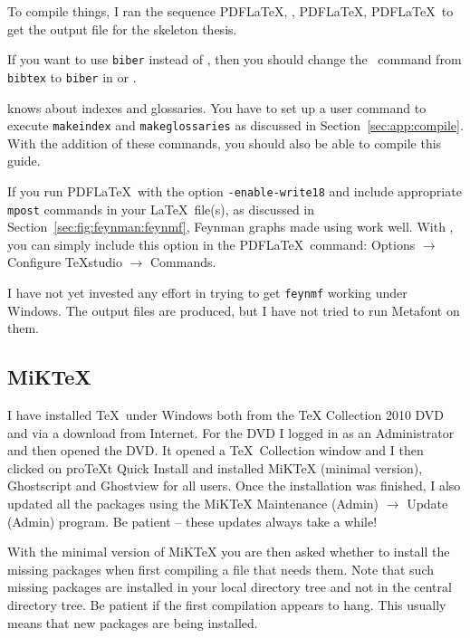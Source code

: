 To compile things, I ran the sequence PDF\LaTeX, \BibTeX, PDF\LaTeX,
PDF\LaTeX\ to get the output file for the skeleton thesis.

If you want to use \texttt{biber} instead of \BibTeX, then you should
change the \BibTeX\ command from \texttt{bibtex} to \texttt{biber} in
\TeXstudio or \TeXworks.

\TeXstudio knows about indexes and glossaries. You have to set up a
user command to execute \texttt{makeindex} and \texttt{makeglossaries}
as discussed in Section~\ref{sec:app:compile}. With the addition of
these commands, you should also be able to compile this guide.

If you run PDF\LaTeX\ with the option \texttt{-enable-write18} and
include appropriate \texttt{mpost} commands in your \LaTeX\ file(s), as
discussed in Section~\ref{sec:fig:feynman:feynmf}, Feynman graphs made
using  work well. With \TeXstudio, you can simply
include this option in the PDF\LaTeX\ command: \textsf{Options} $\to$
\textsf{Configure TeXstudio} $\to$ \textsf{Commands}.

I have not yet invested any effort in trying to get \texttt{feynmf}
working under Windows. The output files are produced, but I have not
tried to run Metafont on them.


\subsection{MiK\TeX}
\label{sec:app:miktex}

I have installed \TeX\ under Windows both from the \TeX{} Collection
2010 DVD and via a download from Internet. For the DVD I logged in as
an Administrator and then opened the DVD. It opened a \TeX\ Collection
window and I then clicked on pro\TeX t Quick Install and installed
MiK\TeX{} (minimal version),
Ghostscript and Ghostview for all
users. Once the installation was finished, I also updated all the
packages using the MiK\TeX{} Maintenance (Admin) $\to$ Update (Admin)
program. Be patient -- these updates always take a while!

With the minimal version of MiK\TeX{} you are then asked whether to
install the missing packages when first compiling a file that needs
them. Note that such missing packages are installed in your local
directory tree and not in the central directory tree. Be patient if
the first compilation appears to hang. This usually means that new
packages are being installed.

